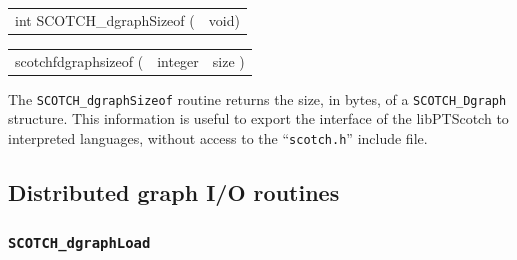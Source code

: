 \begin{itemize}
\progsyn

{\tt\begin{tabular}{l@{}l}
int SCOTCH\_dgraphSizeof ( & void)
\end{tabular}}

{\tt\begin{tabular}{l@{}ll}
scotchfdgraphsizeof ( & integer & size )
\end{tabular}}

\progdes

The {\tt SCOTCH\_dgraphSizeof} routine returns the size, in bytes, of a
{\tt SCOTCH\_\lbt Dgraph} structure. This information is useful to
export the interface of the {\sc libPTScotch} to interpreted languages,
without access to the ``{\tt scotch.h}'' include file.
\end{itemize}

\subsection{Distributed graph I/O routines}

\subsubsection{{\tt SCOTCH\_dgraphLoad}}
\label{sec-lib-dgraphload}

